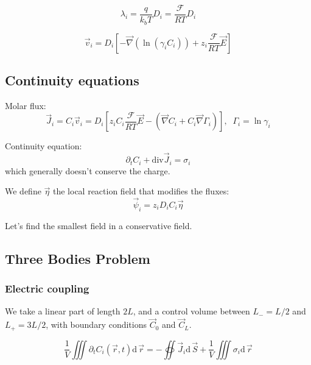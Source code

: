 \documentclass[aps,12pt]{revtex4}
\begin{document}
\begin{equation}
	\lambda_i = \frac{q}{k_bT} D_i = \dfrac{\mathcal{F}}{RT} D_i
\end{equation}

\begin{equation}
\boxed{
	\vec{v}_i = D_i \left[ - \vec{\nabla}(\ln(\gamma_i C_i)) + z_i \dfrac{\mathcal{F}}{RT} \vec{E} \right]
}
\end{equation}

\subsection{Continuity equations}

Molar flux:
\begin{equation}
	\vec{J}_i = C_i \vec{v}_i = D_i \left[z_i C_i  \dfrac{\mathcal{F}}{RT} \vec{E} - \left(\vec{\nabla} C_i + C_i \vec{\nabla}\Gamma_i\right) \right],\;\;\Gamma_i = \ln \gamma_i
\end{equation}

Continuity equation:
\begin{equation}
	\partial_t C_i + \mathrm{div} \vec{J}_i = \sigma_i
\end{equation}
which generally doesn't conserve the charge.

We define $\vec \eta$ the local reaction field that modifies the fluxes:
\begin{equation}
	\vec \psi_i = z_i D_i C_i \vec \eta
\end{equation}

Let's find the smallest field in a conservative field.

\subsection{Three Bodies Problem}

\subsubsection{Electric coupling}
We take a linear part of length $2L$, and a control volume between $L_-=L/2$ and $L_+=3L/2$,
with boundary conditions $\vec C_0$ and $\vec C_L$.

\begin{equation}
	\dfrac{1}{V} \iiint \partial_t C_i(\vec r,t)  \mathrm{d}\, \vec r
	= - \oiint  	\vec{J}_i \mathrm{d}\, \vec S + \dfrac{1}{V} \iiint \sigma_i \mathrm{d}\, \vec r
\end{equation}
 
\end{document}
